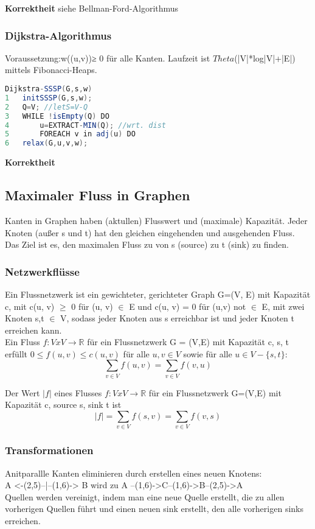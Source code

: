 \documentclass[jou,apacite]{apa6}
\begin{document}
{\bfseries Korrektheit} siehe Bellman-Ford-Algorithmus
\subsubsection{Dijkstra-Algorithmus} Voraussetzung:w((u,v))≥ 0 für alle Kanten. Laufzeit ist $Theta$(|V|*log|V|+|E|) mittels Fibonacci-Heaps.
\begin{lstlisting}[language =java]
Dijkstra-SSSP(G,s,w)
1   initSSSP(G,s,w);
2   Q=V; //letS=V-Q
3   WHILE !isEmpty(Q) DO
4       u=EXTRACT-MIN(Q); //wrt. dist
5       FOREACH v in adj(u) DO
6   relax(G,u,v,w);
\end{lstlisting}
{\bfseries Korrektheit }
\subsection{Maximaler Fluss in Graphen}
Kanten in Graphen haben (aktullen) Flusswert und (maximale) Kapazität. Jeder Knoten (außer s und t) hat den gleichen eingehenden und ausgehenden Fluss. Das Ziel ist es, den maximalen Fluss zu von s (source) zu t (sink) zu finden. 


\subsubsection{Netzwerkflüsse}
Ein Flussnetzwerk ist ein gewichteter, gerichteter Graph G=(V, E) mit Kapazität c, mit c(u, v) $\ge$ 0 für (u, v) $\in$ E und c(u, v) = 0 für (u,v) not $\in$ E, mit zwei Knoten s,t $\in$ V, sodass jeder Knoten aus s erreichbar ist und jeder Knoten t erreichen kann. \\
Ein Fluss $f: V x V \rightarrow \mathbb{R}$ für ein Flussnetzwerk G = (V,E) mit Kapazität c, s, t erfüllt $0\le f(u,v) \le c(u,v)$ für alle $u,v\in V$ sowie für alle $u \in V - \{s,t\}$:
$$\sum\limits_{v\in V} f(u, v) = \sum\limits_{v\in V} f(v, u)$$

Der Wert $|f|$ eines Flusses $f: VxV \rightarrow \mathbb{R}$ für ein Flussnetzwerk G=(V,E) mit Kapazität c, source s, sink t ist $$|f| = \sum\limits_{v\in V} f(s, v) = \sum\limits_{v\in V} f(v, s)$$

\subsubsection{Transformationen}
Anitparallle Kanten eliminieren durch erstellen eines neuen Knotens: \\
A <-(2,5)--|--(1,6)-> B wird zu A --(1,6)->C--(1,6)->B--(2,5)->A \\
Quellen werden vereinigt, indem man eine neue Quelle erstellt, die zu allen vorherigen Quellen führt und einen neuen sink erstellt, den alle vorherigen sinks erreichen.
\end{document}
